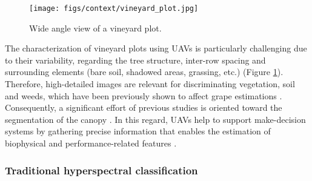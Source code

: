 \begin{figure}[ht]
	\texttt{[image: figs/context/vineyard\_plot.jpg]}
	\caption{Wide angle view of a vineyard plot.}
    \label{fig:vineyard_plot_sample}
\end{figure}

The characterization of vineyard plots using UAVs is particularly challenging due to their variability, regarding the tree structure, inter-row spacing and surrounding elements (bare soil, shadowed areas, grassing, etc.) (Figure \ref{fig:vineyard_plot_sample}). Therefore, high-detailed images are relevant for discriminating vegetation, soil and weeds, which have been previously shown to affect grape estimations \cite{ammoniaci_state_2021, sassu_advances_2021}. Consequently, a significant effort of previous studies is oriented toward the segmentation of the canopy \cite{padua_vineyard_2022}. In this regard, UAVs help to support make-decision systems by gathering precise information that enables the estimation of biophysical and performance-related features \cite{bramley_12_2010}.

\subsubsection{Traditional hyperspectral classification}

